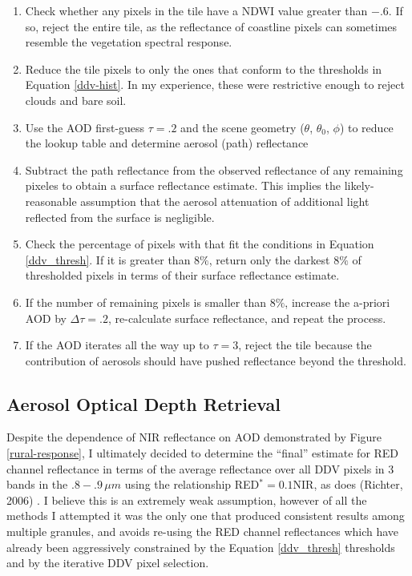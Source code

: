\documentclass[12pt]{article}
\begin{document}
\begin{enumerate}
    \item Check whether any pixels in the tile have a NDWI value greater than $-.6$. If so, reject the entire tile, as the reflectance of coastline pixels can sometimes resemble the vegetation spectral response.
    \item Reduce the tile pixels to only the ones that conform to the thresholds in Equation \ref{ddv-hist}. In my experience, these were restrictive enough to reject clouds and bare soil.
    \item Use the AOD first-guess $\tau=.2$ and the scene geometry ($\theta$, $\theta_0$, $\phi$) to reduce the lookup table and determine aerosol (path) reflectance
    \item Subtract the path reflectance from the observed reflectance of any remaining pixeles to obtain a surface reflectance estimate. This implies the likely-reasonable assumption that the aerosol attenuation of additional light reflected from the surface is negligible.
    \item Check the percentage of pixels with that fit the conditions in Equation \ref{ddv_thresh}. If it is greater than $8\%$, return only the darkest $8\%$ of thresholded pixels in terms of their surface reflectance estimate.
    \item If the number of remaining pixels is smaller than $8\%$, increase the a-priori AOD by $\Delta \tau=.2$, re-calculate surface reflectance, and repeat the process.
    \item If the AOD iterates all the way up to $\tau = 3$, reject the tile because the contribution of aerosols should have pushed reflectance beyond the threshold.
\end{enumerate}

\subsection{Aerosol Optical Depth Retrieval}

Despite the dependence of NIR reflectance on AOD demonstrated by Figure \ref{rural-response}, I ultimately decided to determine the ``final'' estimate for RED channel reflectance in terms of the average reflectance over all DDV pixels in 3 bands in the $.8-.9\,\si{\mu m}$ using the relationship RED$^* = 0.1$NIR, as does (Richter, 2006) \cite{richter_automatic_2006}. I believe this is an extremely weak assumption, however of all the methods I attempted it was the only one that produced consistent results among multiple granules, and avoids re-using the RED channel reflectances which have already been aggressively constrained by the Equation \ref{ddv_thresh} thresholds and by the iterative DDV pixel selection.
\end{document}
